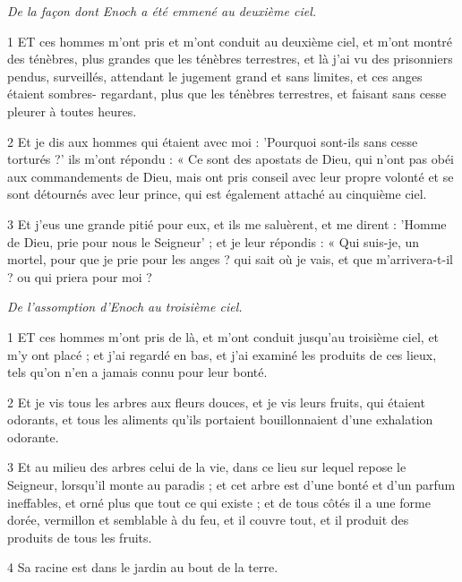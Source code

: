 \par \textit{De la façon dont Enoch a été emmené au deuxième ciel.}

\par 1 ET ces hommes m'ont pris et m'ont conduit au deuxième ciel, et m'ont montré des ténèbres, plus grandes que les ténèbres terrestres, et là j'ai vu des prisonniers pendus, surveillés, attendant le jugement grand et sans limites, et ces anges étaient sombres- regardant, plus que les ténèbres terrestres, et faisant sans cesse pleurer à toutes heures.

\par 2 Et je dis aux hommes qui étaient avec moi : 'Pourquoi sont-ils sans cesse torturés ?' ils m'ont répondu : « Ce sont des apostats de Dieu, qui n'ont pas obéi aux commandements de Dieu, mais ont pris conseil avec leur propre volonté et se sont détournés avec leur prince, qui est également attaché au cinquième ciel.

\par 3 Et j'eus une grande pitié pour eux, et ils me saluèrent, et me dirent : 'Homme de Dieu, prie pour nous le Seigneur' ; et je leur répondis : « Qui suis-je, un mortel, pour que je prie pour les anges ? qui sait où je vais, et que m'arrivera-t-il ? ou qui priera pour moi ?


\par \textit{De l'assomption d'Enoch au troisième ciel.}

\par 1 ET ces hommes m'ont pris de là, et m'ont conduit jusqu'au troisième ciel, et m'y ont placé ; et j'ai regardé en bas, et j'ai examiné les produits de ces lieux, tels qu'on n'en a jamais connu pour leur bonté.

\par 2 Et je vis tous les arbres aux fleurs douces, et je vis leurs fruits, qui étaient odorants, et tous les aliments qu'ils portaient bouillonnaient d'une exhalation odorante.

\par 3 Et au milieu des arbres celui de la vie, dans ce lieu sur lequel repose le Seigneur, lorsqu'il monte au paradis ; et cet arbre est d'une bonté et d'un parfum ineffables, et orné plus que tout ce qui existe ; et de tous côtés il a une forme dorée, vermillon et semblable à du feu, et il couvre tout, et il produit des produits de tous les fruits.

\par 4 Sa racine est dans le jardin au bout de la terre.

